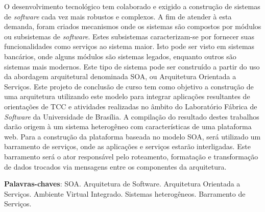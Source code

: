 \begin{resumo}

O desenvolvimento tecnológico tem colaborado e exigido a construção de sistemas de \textit{software} cada vez mais robustos e complexos. A fim de atender à esta demanda, foram criados mecanismos onde os sistemas são compostos por módulos ou subsistemas de \textit{software}. Estes subsistemas caracterizam-se por fornecer suas funcionalidades como serviços ao sistema maior. Isto pode ser visto em sistemas bancários, onde alguns módulos são sistemas legados, enquanto outros são sistemas mais modernos. Este tipo de sistema pode ser construído a partir do uso da abordagem arquitetural denominada SOA, ou Arquitetura Orientada a Serviços. Este projeto de conclusão de curso tem como objetivo a construção de uma arquitetura utilizando este modelo para integrar aplicações resultantes de orientações de TCC e atividades realizadas no âmbito do Laboratório Fábrica de \textit{Software} da Universidade de Brasília. A compilação do resultado destes trabalhos darão origem à um sistema heterogêneo com características de uma plataforma web. Para a construção da plataforma baseada no modelo SOA, será utilizado um barramento de serviços, onde as aplicações e serviços estarão interligadas. Este barramento será o ator responsável pelo roteamento, formatação e transformação de dados trocados via mensagens entre os componentes da arquitetura.

 \vspace{\onelineskip}
    
 \noindent
 \textbf{Palavras-chaves}: SOA. Arquitetura de Software. Arquitetura Orientada a Serviços. Ambiente Virtual Integrado. Sistemas heterogêneos. Barramento de Serviços.
\end{resumo}
